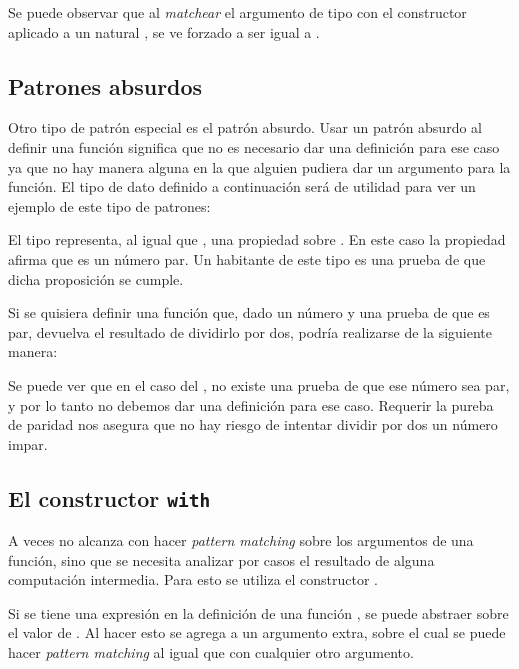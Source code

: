 
Se puede observar que al \textit{matchear} el argumento de tipo   con el constructor  aplicado a un natural ,  se ve forzado a ser igual a  \AgdaFunction{*} .


\subsection{Patrones absurdos}\label{tipos:absurdos}

Otro tipo de patrón especial es el patrón absurdo. Usar un patrón absurdo al definir una función significa que no es necesario dar una definición para ese caso ya que no hay manera alguna en la que alguien pudiera dar un argumento para la función. El tipo de dato definido a continuación será de utilidad para ver un ejemplo de este tipo de patrones:


El tipo   representa, al igual que  , una propiedad sobre . En este caso la propiedad afirma que  es un número par. Un habitante de este tipo es una prueba de que dicha proposición se cumple. 

Si se quisiera definir una función que, dado un número y una prueba de que es par, devuelva el resultado de dividirlo por dos, podría realizarse de la siguiente manera:


Se puede ver que en el caso del , no existe una prueba de que ese número sea par, y por lo tanto no debemos dar una definición para ese caso. Requerir la pureba de paridad nos asegura que no hay riesgo de intentar dividir por dos un número impar. 

\subsection{El constructor \texttt{with}}\label{tipos:with}

A veces no alcanza con hacer \textit{pattern matching} sobre los argumentos de una función, sino que se necesita analizar por casos el resultado de alguna computación intermedia. Para esto se utiliza el constructor . 

Si se tiene una expresión  en la definición de una función , se puede abstraer  sobre el valor de . Al hacer esto se agrega a  un argumento extra, sobre el cual se puede hacer \textit{pattern matching} al igual que con cualquier otro argumento. 

